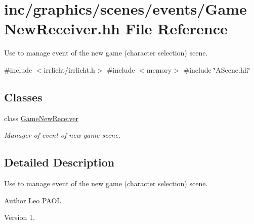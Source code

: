 \hypertarget{GameNewReceiver_8hh}{}\section{inc/graphics/scenes/events/\+Game\+New\+Receiver.hh File Reference}
\label{GameNewReceiver_8hh}


Use to manage event of the new game (character selection) scene.  


{\ttfamily \#include $<$irrlicht/irrlicht.\+h$>$}\newline
{\ttfamily \#include $<$memory$>$}\newline
{\ttfamily \#include \char`\"{}A\+Scene.\+hh\char`\"{}}\newline
\subsection*{Classes}
\begin{DoxyCompactItemize}
\item 
class \hyperlink{classGameNewReceiver}{Game\+New\+Receiver}
\begin{DoxyCompactList}\small\item\em Manager of event of new game scene. \end{DoxyCompactList}\end{DoxyCompactItemize}


\subsection{Detailed Description}
Use to manage event of the new game (character selection) scene. 

\begin{DoxyAuthor}{Author}
Leo P\+A\+OL 
\end{DoxyAuthor}
\begin{DoxyVersion}{Version}
1. 
\end{DoxyVersion}
